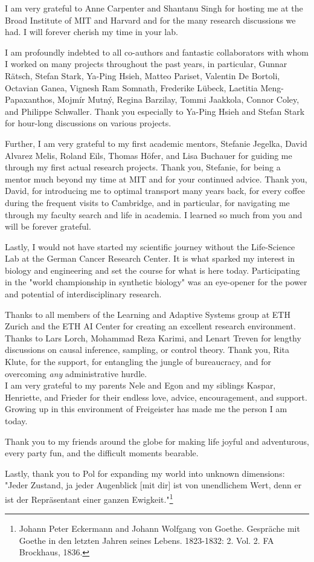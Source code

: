 I am very grateful to Anne Carpenter and Shantanu Singh for hosting me at the Broad Institute of MIT and Harvard and for the many research discussions we had. I will forever cherish my time in your lab.

I am profoundly indebted to all co-authors and fantastic collaborators with whom I worked on many projects throughout the past years, in particular, Gunnar R\"atsch, Stefan Stark, Ya-Ping Hsieh,  Matteo Pariset, Valentin De Bortoli, Octavian Ganea, Vignesh Ram Somnath, Frederike L{\"u}beck, Laetitia Meng-Papaxanthos, Mojm{\'i}r Mutn{\'y}, Regina Barzilay, Tommi Jaakkola, Connor Coley, and Philippe Schwaller. Thank you especially to Ya-Ping Hsieh and Stefan Stark for hour-long discussions on various projects. 

Further, I am very grateful to my first academic mentors, Stefanie Jegelka, David Alvarez Melis, Roland Eils, Thomas H{\"o}fer, and Lisa Buchauer for guiding me through my first actual research projects.
Thank you, Stefanie, for being a mentor much beyond my time at MIT and for your continued advice. 
Thank you, David, for introducing me to optimal transport many years back, for every coffee during the frequent visits to Cambridge, and in particular, for navigating me through my faculty search and life in academia. I learned so much from you and will be forever grateful.

Lastly, I would not have started my scientific journey without the Life-Science Lab at the German Cancer Research Center. It is what sparked my interest in biology and engineering and set the course for what is here today.
Participating in the "world championship in synthetic biology" was an eye-opener for the power and potential of interdisciplinary research.

 Thanks to all members of the Learning and Adaptive Systems group at ETH Zurich and the ETH AI Center for creating an excellent research environment. Thanks to Lars Lorch, Mohammad Reza Karimi, and Lenart Treven for lengthy discussions on causal inference, sampling, or control theory. 
Thank you, Rita Klute, for the support, for entangling the jungle of bureaucracy, and for overcoming \emph{any} administrative hurdle. \\

I am very grateful to my parents Nele and Egon and my siblings Kaspar, Henriette, and Frieder for their endless love, advice, encouragement, and support.
Growing up in this environment of Freigeister has made me the person I am today.

Thank you to my friends around the globe for making life joyful and adventurous, every party fun, and the difficult moments bearable.

Lastly, thank you to Pol for expanding my world into unknown dimensions: "Jeder Zustand, ja jeder Augenblick [mit dir] ist von unendlichem Wert, denn er ist der Repr{\"a}sentant einer ganzen Ewigkeit."\footnote{Johann Peter Eckermann and Johann Wolfgang von Goethe. Gespr{\"a}che mit Goethe in den letzten Jahren seines Lebens. 1823-1832: 2. Vol. 2. FA Brockhaus, 1836.}


\endgroup

